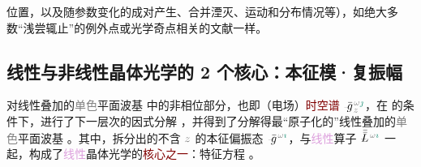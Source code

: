 \clearpage

\noindent 位置，以及随参数变化的成对产生、合并湮灭、运动和分布情况等），如绝大多数“浅尝辄止”的\textcolor{PineGreen}{例外点}\cite{hernandezExceptionalPointsNonHermitian2011,hanExceptionalEntanglementPhenomena2023,baiObservationNonlinearExceptional2024,baiNonlinearExceptionalPoints2023}或\textcolor{PineGreen}{光学奇点}\cite{richterExceptionalPointsAnisotropic2017,grundmannSingularOpticalAxes2016,berryOpticalSingularitiesBirefringent2003,berryOpticalSingularitiesBianisotropic2005,grundmannOpticallyAnisotropicMedia2017}相关的文献一样。

\vspace*{-4.5em}

\subsection{线性与非线性晶体光学的 2 个核心：本征模·复振幅}\label{ssec:eigenmodes-compamp}

 对\textcolor{PineGreen}{线性叠加的\textcolor{gray}{单色}平面波基}  中的\textcolor{NavyBlue}{非相位部分}，也即（电场）\textcolor{Maroon}{时空谱} $\Xint{{}^{}_{\mathcolor{gray}{-}}}{10}{\bar{g}}^{\;\!\mathcolor{gray}{\omega} \textcolor{PineGreen}{\jmath}}_{\;\! \mathcolor{gray}{z}}$，在  的条件下，进行了下一层次的因式分解 ，并得到了分解得最“原子化的”\textcolor{PineGreen}{线性叠加的\textcolor{gray}{单色}平面波基} 。其中，拆分出的不含 $\mathcolor{gray}{z}$ 的\textcolor{PineGreen}{本征偏振态} $\Xint{{}^{}_{\mathcolor{gray}{-}}}{10}{\bar{g}}^{\;\!\mathcolor{gray}{\omega} \textcolor{PineGreen}{\imath}}$，与\textcolor{Plum}{线性}算子 $\Xint{\mathcolor{gray}{-}}{30}{\bar{\bar{L}}}^{\;\! \mathcolor{gray}{\omega} \textcolor{PineGreen}{\imath}}$ 一起，构成了\textcolor{Plum}{线性}\textcolor{PineGreen}{晶体光学}的\textcolor{Maroon}{核心之一}：\textcolor{PineGreen}{特征方程} 。

